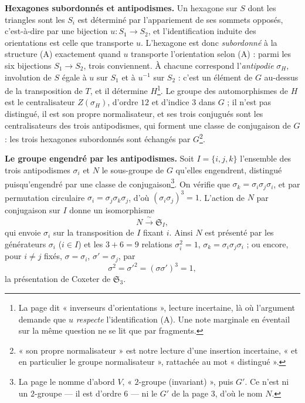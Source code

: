 \documentclass[11pt,a4paper]{article}
\begin{document}
\textbf{Hexagones subordonnés et antipodismes.} Un hexagone sur $S$ dont les
triangles sont les $S_i$ est déterminé par l'appariement de ses sommets opposés,
c'est-à-dire par une bijection $u : S_1 \to S_2$, et l'identification induite des
orientations est celle que transporte $u$. L'hexagone est donc \emph{subordonné}
à la structure (A) exactement quand $u$ transporte l'orientation selon (A) :
parmi les six bijections $S_1 \to S_2$, trois conviennent. À chacune correspond
l'\emph{antipodie} $\sigma_H$, involution de $S$ égale à $u$ sur $S_1$ et à
$u^{-1}$ sur $S_2$ : c'est un élément de $G$ au-dessus de la transposition de $T$,
et il détermine $H$\footnote{La page dit « inverseurs d'orientations », lecture
incertaine, là où l'argument demande que $u$ \emph{respecte} l'identification
(A). Une note marginale en éventail sur la même question ne se lit que par
fragments.}. Le groupe des automorphismes de $H$ est le centralisateur
$Z(\sigma_H)$, d'ordre $12$ et d'indice $3$ dans $G$ ; il n'est pas distingué, il
est son propre normalisateur, et ses trois conjugués sont les centralisateurs des
trois antipodismes, qui forment une classe de conjugaison de $G$ : les trois
hexagones subordonnés sont échangés par $G$\footnote{« son propre normalisateur »
est notre lecture d'une insertion incertaine, « et en particulier le groupe
normalisateur », rattachée au mot « distingué ».}.

\textbf{Le groupe engendré par les antipodismes.} Soit $I = \{i, j, k\}$ l'ensemble
des trois antipodismes $\sigma_i$ et $N$ le sous-groupe de $G$ qu'elles engendrent,
distingué puisqu'engendré par une classe de conjugaison\footnote{La page le
nomme d'abord $V$, « $2$-groupe (invariant) », puis $G'$. Ce n'est ni un
$2$-groupe — il est d'ordre $6$ — ni le $G'$ de la page 3, d'où le nom $N$.}. On
vérifie que $\sigma_k = \sigma_i \sigma_j \sigma_i$, et par permutation circulaire
$\sigma_i = \sigma_j\sigma_k\sigma_j$, d'où $(\sigma_i\sigma_j)^3 = 1$. L'action de $N$ par
conjugaison sur $I$ donne un isomorphisme
\[
N \xrightarrow{\ \sim\ } \mathfrak{S}_I ,
\]
qui envoie $\sigma_i$ sur la transposition de $I$ fixant $i$. Ainsi $N$ est
présenté par les générateurs $\sigma_i$ ($i \in I$) et les $3 + 6 = 9$ relations
$\sigma_i^2 = 1$, $\sigma_k = \sigma_i\sigma_j\sigma_i$ ; ou encore, pour $i \neq j$ fixés,
$\sigma = \sigma_i$, $\sigma' = \sigma_j$, par
\[
\sigma^2 = \sigma'^2 = (\sigma\sigma')^3 = 1 ,
\]
la présentation de Coxeter de $\mathfrak{S}_3$.
\end{document}

